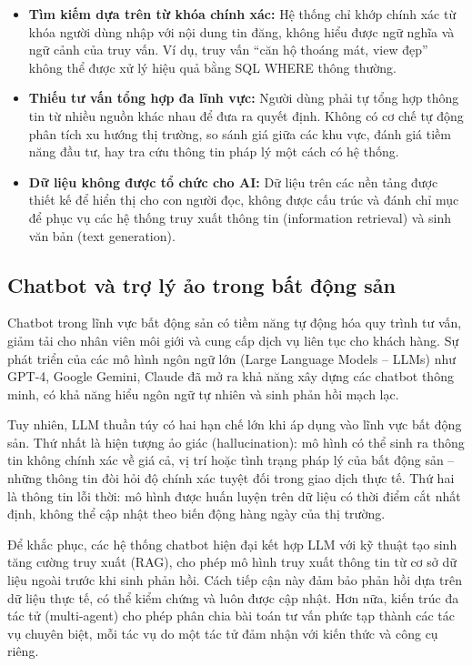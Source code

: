 \begin{itemize}
    \item \textbf{Tìm kiếm dựa trên từ khóa chính xác:} Hệ thống chỉ khớp chính xác từ khóa người dùng nhập với nội dung tin đăng, không hiểu được ngữ nghĩa và ngữ cảnh của truy vấn. Ví dụ, truy vấn ``căn hộ thoáng mát, view đẹp'' không thể được xử lý hiệu quả bằng SQL WHERE thông thường.

    \item \textbf{Thiếu tư vấn tổng hợp đa lĩnh vực:} Người dùng phải tự tổng hợp thông tin từ nhiều nguồn khác nhau để đưa ra quyết định. Không có cơ chế tự động phân tích xu hướng thị trường, so sánh giá giữa các khu vực, đánh giá tiềm năng đầu tư, hay tra cứu thông tin pháp lý một cách có hệ thống.

    \item \textbf{Dữ liệu không được tổ chức cho AI:} Dữ liệu trên các nền tảng được thiết kế để hiển thị cho con người đọc, không được cấu trúc và đánh chỉ mục để phục vụ các hệ thống truy xuất thông tin (information retrieval) và sinh văn bản (text generation).
\end{itemize}

\subsection{Chatbot và trợ lý ảo trong bất động sản}

Chatbot trong lĩnh vực bất động sản có tiềm năng tự động hóa quy trình tư vấn, giảm tải cho nhân viên môi giới và cung cấp dịch vụ liên tục cho khách hàng. Sự phát triển của các mô hình ngôn ngữ lớn (Large Language Models -- LLMs) như GPT-4, Google Gemini, Claude đã mở ra khả năng xây dựng các chatbot thông minh, có khả năng hiểu ngôn ngữ tự nhiên và sinh phản hồi mạch lạc.

Tuy nhiên, LLM thuần túy có hai hạn chế lớn khi áp dụng vào lĩnh vực bất động sản. Thứ nhất là hiện tượng ảo giác (hallucination): mô hình có thể sinh ra thông tin không chính xác về giá cả, vị trí hoặc tình trạng pháp lý của bất động sản -- những thông tin đòi hỏi độ chính xác tuyệt đối trong giao dịch thực tế. Thứ hai là thông tin lỗi thời: mô hình được huấn luyện trên dữ liệu có thời điểm cắt nhất định, không thể cập nhật theo biến động hàng ngày của thị trường.

Để khắc phục, các hệ thống chatbot hiện đại kết hợp LLM với kỹ thuật tạo sinh tăng cường truy xuất (RAG), cho phép mô hình truy xuất thông tin từ cơ sở dữ liệu ngoài trước khi sinh phản hồi. Cách tiếp cận này đảm bảo phản hồi dựa trên dữ liệu thực tế, có thể kiểm chứng và luôn được cập nhật. Hơn nữa, kiến trúc đa tác tử (multi-agent) cho phép phân chia bài toán tư vấn phức tạp thành các tác vụ chuyên biệt, mỗi tác vụ do một tác tử đảm nhận với kiến thức và công cụ riêng.

